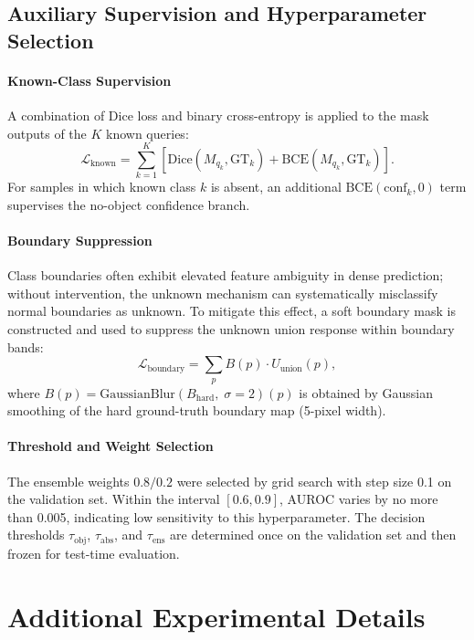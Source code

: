 \documentclass[11pt]{article}
\newcommand{\tobj}{\tau_{\text{obj}}}
\newcommand{\tabs}{\tau_{\text{abs}}}
\newcommand{\tens}{\tau_{\text{ens}}}
\begin{document}
\subsection{Auxiliary Supervision and Hyperparameter Selection}

\paragraph{Known-Class Supervision}
A combination of Dice loss and binary cross-entropy is applied to the mask outputs of
the $K$ known queries:
\begin{equation}
  \mathcal{L}_{\text{known}} = \sum_{k=1}^{K} \left[\text{Dice}(M_{q_k}, \text{GT}_k) + \text{BCE}(M_{q_k}, \text{GT}_k)\right].
\end{equation}
For samples in which known class $k$ is absent, an additional
$\text{BCE}(\text{conf}_k, 0)$ term supervises the no-object confidence branch.

\paragraph{Boundary Suppression}
Class boundaries often exhibit elevated feature ambiguity in dense prediction; without
intervention, the unknown mechanism can systematically misclassify normal boundaries as
unknown.
To mitigate this effect, a soft boundary mask is constructed and used to suppress the
unknown union response within boundary bands:
\begin{equation}
  \mathcal{L}_{\text{boundary}} = \sum_{p} B(p) \cdot U_{\text{union}}(p),
\end{equation}
where $B(p) = \text{GaussianBlur}(B_{\text{hard}},\; \sigma=2)(p)$ is obtained by
Gaussian smoothing of the hard ground-truth boundary map (5-pixel width).

\paragraph{Threshold and Weight Selection}
The ensemble weights $0.8/0.2$ were selected by grid search with step size 0.1 on the
validation set.
Within the interval $[0.6, 0.9]$, AUROC varies by no more than 0.005, indicating low
sensitivity to this hyperparameter.
The decision thresholds $\tobj$, $\tabs$, and $\tens$ are determined once on the
validation set and then frozen for test-time evaluation.

\section{Additional Experimental Details}
\end{document}

